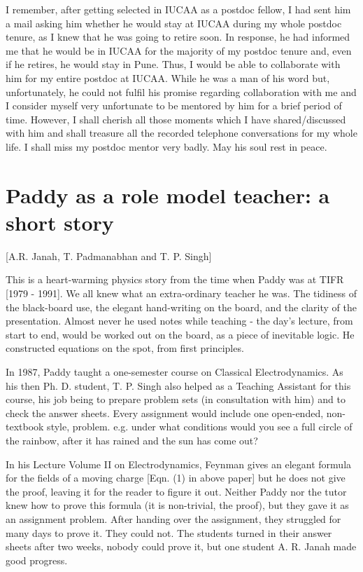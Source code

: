 \documentclass[prd, preprint, longbibliography, 12pt]{revtex4-2}
\begin{document}
     I remember, after getting selected in IUCAA as a postdoc fellow, I had sent him a mail asking him whether he would stay at IUCAA during my whole postdoc tenure, as I knew that he was going to retire soon.  In response, he had informed me that he would be in IUCAA for the majority of my postdoc tenure and, even if he retires, he would stay in Pune. Thus, I would be able to collaborate with him for my entire postdoc at IUCAA. While he was a man of his word but, unfortunately, he could not fulfil his promise regarding collaboration with me and I consider myself very unfortunate to be mentored by him for a brief period of time. However, I shall cherish all those moments which I have shared/discussed with him and shall treasure all the recorded telephone conversations for my whole life.  I shall miss my postdoc mentor very badly. May his soul rest in peace.




\section{Paddy as a role model teacher: a short story}
 [A.R. Janah, T. Padmanabhan and T. P. Singh]

\noindent This is a heart-warming physics story from the time when Paddy was at TIFR [1979 - 1991].
We all knew what an extra-ordinary teacher he was. The tidiness of the black-board use, the elegant hand-writing on the board, and the clarity of the presentation. Almost never he used notes while teaching - the day's lecture, from start to end, would be worked out on the board, as a piece of inevitable logic. He constructed equations on the spot, from first principles.

In 1987, Paddy taught a one-semester course on Classical Electrodynamics. As his then Ph. D. student, T. P. Singh also helped as a Teaching Assistant for this course, his job being to prepare problem sets (in consultation with him) and to check the answer sheets.
Every assignment would include one open-ended, non-textbook style, problem. e.g. under what conditions would you see a full circle of the rainbow, after it has rained and the sun has come out?

In his Lecture Volume II on Electrodynamics, Feynman gives an elegant formula for the fields of a moving charge [Eqn. (1) in above paper] but he does not give the proof, leaving it for the reader to figure it out. Neither Paddy nor the tutor knew how to prove this formula (it is non-trivial, the proof), but they gave it as an assignment problem.
After handing over the assignment, they struggled for many days to prove it. They could not. The students turned in their answer sheets after two weeks, nobody could prove it, but one student A. R. Janah made good progress.
\end{document}
